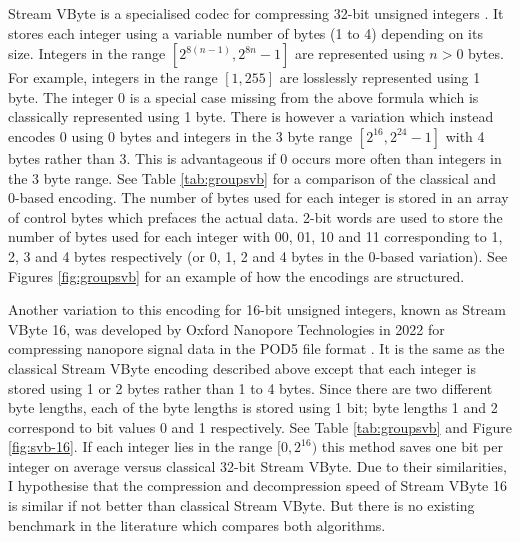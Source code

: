 

Stream VByte is a specialised codec for compressing 32-bit unsigned integers \cite{svb}. It stores each integer using a variable number of bytes (1 to 4) depending on its size. Integers in the range $[2^{8(n-1)},2^{8n}-1]$ are represented using $n>0$ bytes. For example, integers in the range $[1,255]$ are losslessly represented using 1 byte. The integer 0 is a special case missing from the above formula which is classically represented using 1 byte. There is however a variation which instead encodes 0 using 0 bytes and integers in the 3 byte range $[2^{16},2^{24}-1]$ with 4 bytes rather than 3. This is advantageous if 0 occurs more often than integers in the 3 byte range. See Table \ref{tab:groupsvb} for a comparison of the classical and 0-based encoding. The number of bytes used for each integer is stored in an array of control bytes which prefaces the actual data. 2-bit words are used to store the number of bytes used for each integer with 00, 01, 10 and 11 corresponding to 1, 2, 3 and 4 bytes respectively (or 0, 1, 2 and 4 bytes in the 0-based variation). See Figures \ref{fig:groupsvb} for an example of how the encodings are structured.

%



Another variation to this encoding for 16-bit unsigned integers, known as Stream VByte 16, was developed by Oxford Nanopore Technologies in 2022 for compressing nanopore signal data in the POD5 file format \cite{pod5}. It is the same as the classical Stream VByte encoding described above except that each integer is stored using 1 or 2 bytes rather than 1 to 4 bytes. Since there are two different byte lengths, each of the byte lengths is stored using 1 bit; byte lengths 1 and 2 correspond to bit values 0 and 1 respectively. See Table \ref{tab:groupsvb} and Figure \ref{fig:svb-16}. If each integer lies in the range $[0, 2^{16})$ this method saves one bit per integer on average versus classical 32-bit Stream VByte. Due to their similarities, I hypothesise that the compression and decompression speed of Stream VByte 16 is similar if not better than classical Stream VByte. But there is no existing benchmark in the literature which compares both algorithms.

